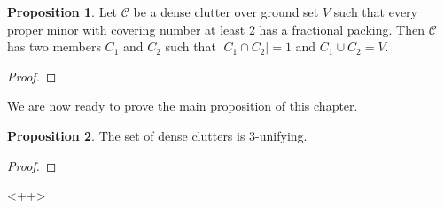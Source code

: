 \documentclass[a4paper, 12pt, twoside=false]{scrbook}
\theoremstyle{definition}
\newtheorem{proposition}{Proposition}
\begin{document}
   \begin{proposition}
       Let $\mathcal{C}$ be a dense clutter over ground set $V$ such that every proper minor with covering number at least 2 has a fractional packing.
       Then $\mathcal{C}$ has two members $C_1$ and $C_2$ such that $|C_1 \cap C_2|=1$ and $C_1 \cup C_2 = V$.
   \end{proposition}

   \begin{proof}

   \end{proof}

   We are now ready to prove the main proposition of this chapter.
   \begin{proposition}
       The set of dense clutters is 3-unifying.
   \end{proposition}

   \begin{proof}

   \end{proof}

   <++>
\end{document}
